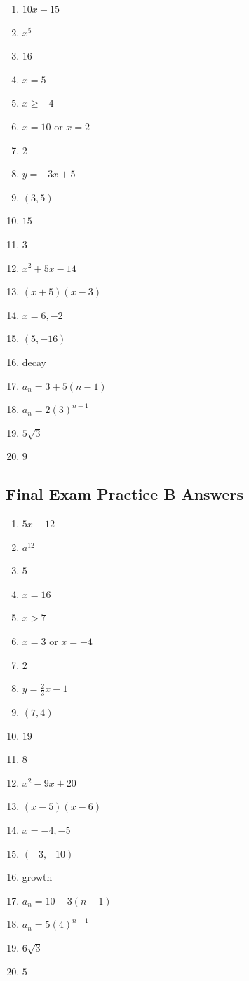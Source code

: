 \documentclass[11pt]{book}
\begin{document}
\begin{enumerate}
\item \(10x-15\)
\item \(x^5\)
\item \(16\)
\item \(x=5\)
\item \(x\ge-4\)
\item \(x=10\) or \(x=2\)
\item \(2\)
\item \(y=-3x+5\)
\item \((3,5)\)
\item \(15\)
\item \(3\)
\item \(x^2+5x-14\)
\item \((x+5)(x-3)\)
\item \(x=6,-2\)
\item \((5,-16)\)
\item decay
\item \(a_n=3+5(n-1)\)
\item \(a_n=2(3)^{n-1}\)
\item \(5\sqrt3\)
\item \(9\)
\end{enumerate}

\subsection{Final Exam Practice B Answers}

\begin{enumerate}
\item \(5x-12\)
\item \(a^{12}\)
\item \(5\)
\item \(x=16\)
\item \(x>7\)
\item \(x=3\) or \(x=-4\)
\item \(2\)
\item \(y=\frac23x-1\)
\item \((7,4)\)
\item \(19\)
\item \(8\)
\item \(x^2-9x+20\)
\item \((x-5)(x-6)\)
\item \(x=-4,-5\)
\item \((-3,-10)\)
\item growth
\item \(a_n=10-3(n-1)\)
\item \(a_n=5(4)^{n-1}\)
\item \(6\sqrt3\)
\item \(5\)
\end{enumerate}
\end{document}
